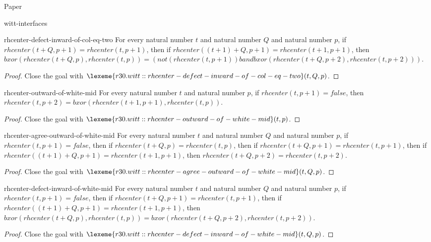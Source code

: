 \begin{lexlean}{Paper}
\begin{section}{witt-interfaces}
  \begin{theorem}{rhcenter-defect-inward-of-col-eq-two}
  For every natural number \(t\) and natural number \(Q\) and natural number \(p\), if \(rhcenter(t + Q, p + 1) = rhcenter(t, p + 1)\), then if \(rhcenter((t + 1) + Q, p + 1) = rhcenter(t + 1, p + 1)\), then \(bxor(rhcenter(t + Q, p), rhcenter(t, p)) = (not(rhcenter(t, p + 1)) band bxor(rhcenter(t + Q, p + 2), rhcenter(t, p + 2)))\).
  \begin{proof}
  Close the goal with \(\lexeme{r30.witt::rhcenter-defect-inward-of-col-eq-two}(t, Q, p)\).
  \end{proof}
  \end{theorem}

  \begin{theorem}{rhcenter-outward-of-white-mid}
  For every natural number \(t\) and natural number \(p\), if \(rhcenter(t, p + 1) = false\), then \(rhcenter(t, p + 2) = bxor(rhcenter(t + 1, p + 1), rhcenter(t, p))\).
  \begin{proof}
  Close the goal with \(\lexeme{r30.witt::rhcenter-outward-of-white-mid}(t, p)\).
  \end{proof}
  \end{theorem}

  \begin{theorem}{rhcenter-agree-outward-of-white-mid}
  For every natural number \(t\) and natural number \(Q\) and natural number \(p\), if \(rhcenter(t, p + 1) = false\), then if \(rhcenter(t + Q, p) = rhcenter(t, p)\), then if \(rhcenter(t + Q, p + 1) = rhcenter(t, p + 1)\), then if \(rhcenter((t + 1) + Q, p + 1) = rhcenter(t + 1, p + 1)\), then \(rhcenter(t + Q, p + 2) = rhcenter(t, p + 2)\).
  \begin{proof}
  Close the goal with \(\lexeme{r30.witt::rhcenter-agree-outward-of-white-mid}(t, Q, p)\).
  \end{proof}
  \end{theorem}

  \begin{theorem}{rhcenter-defect-inward-of-white-mid}
  For every natural number \(t\) and natural number \(Q\) and natural number \(p\), if \(rhcenter(t, p + 1) = false\), then if \(rhcenter(t + Q, p + 1) = rhcenter(t, p + 1)\), then if \(rhcenter((t + 1) + Q, p + 1) = rhcenter(t + 1, p + 1)\), then \(bxor(rhcenter(t + Q, p), rhcenter(t, p)) = bxor(rhcenter(t + Q, p + 2), rhcenter(t, p + 2))\).
  \begin{proof}
  Close the goal with \(\lexeme{r30.witt::rhcenter-defect-inward-of-white-mid}(t, Q, p)\).
  \end{proof}
  \end{theorem}


\end{section}
\end{lexlean}
